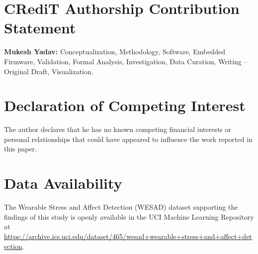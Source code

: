 \documentclass[preprint,12pt,3p]{elsarticle}
\begin{document}
\section*{CRediT Authorship Contribution Statement}
\textbf{Mukesh Yadav:} Conceptualization, Methodology, Software, Embedded Firmware, Validation, Formal Analysis, Investigation, Data Curation, Writing – Original Draft, Visualization.

\section*{Declaration of Competing Interest}
The author declares that he has no known competing financial interests or personal relationships that could have appeared to influence the work reported in this paper.

\section*{Data Availability}
The Wearable Stress and Affect Detection (WESAD) dataset supporting the findings of this study is openly available in the UCI Machine Learning Repository at \url{https://archive.ics.uci.edu/dataset/465/wesad+wearable+stress+and+affect+detection}.



\end{document}
